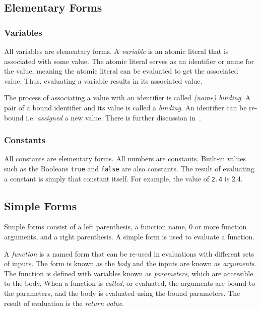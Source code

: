 \documentclass[a4paper, 12pt]{article}
\begin{document}
\subsection{Elementary Forms}
\subsubsection{Variables}
All variables are elementary forms. A \textit{variable} is an atomic literal that is associated with some value. The atomic literal serves as an identifier or name for the value, meaning the atomic literal can be evaluated to get the associated value. Thus, evaluating a variable results in its associated value.

The process of associating a value with an identifier is called \textit{(name) binding}. A pair of a bound identifier and its value is called a \textit{binding}. An identifier can be re-bound i.e. \textit{assigned} a new value. There is further discussion in~.

\subsubsection{Constants}
All constants are elementary forms. All numbers are constants. Built-in values such as the Booleans \texttt{true} and \texttt{false} are also constants. The result of evaluating a constant is simply that constant itself. For example, the value of \texttt{2.4} is 2.4.

\subsection{Simple Forms}\label{subsec:simpleforms}
Simple forms consist of a left parenthesis, a function name, 0 or more function arguments, and a right parenthesis. A simple form is used to evaluate a function.

A \textit{function} is a named form that can be re-used in evaluations with different sets of inputs. The form is known as the \textit{body} and the inputs are known as \textit{arguments}. The function is defined with variables known as \textit{parameters}, which are accessible to the body. When a function is \textit{called}, or evaluated, the arguments are bound to the parameters, and the body is evaluated using the bound parameters. The result of evaluation is the \textit{return value}.
\end{document}
